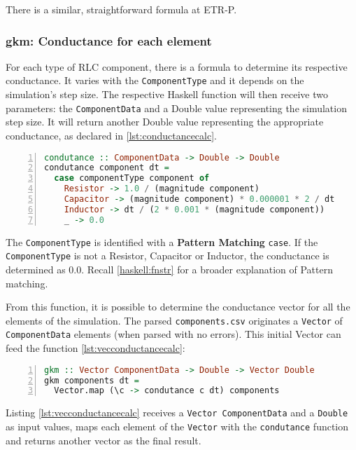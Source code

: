 There is a similar, straightforward formula at ETR-P.

\subsubsection {gkm: Conductance for each element}

For each type of RLC component, there is a formula to determine its respective conductance. It varies with the \lstinline!ComponentType! and it depends on the simulation's step size. The respective Haskell function will then receive two parameters: the \lstinline!ComponentData! and a Double value representing the simulation step size. It will return another Double value representing the appropriate conductance, as declared in \cref{lst:conductancecalc}.


\begin{lstlisting}[language=Haskell, numbers=left, caption={Determining the conductance for each element gkm}, captionpos=b, label={lst:conductancecalc}]
condutance :: ComponentData -> Double -> Double
condutance component dt =
  case componentType component of
    Resistor -> 1.0 / (magnitude component)
    Capacitor -> (magnitude component) * 0.000001 * 2 / dt
    Inductor -> dt / (2 * 0.001 * (magnitude component))
    _ -> 0.0
\end{lstlisting}

The \lstinline!ComponentType! is identified with a \textbf{Pattern Matching} \lstinline!case!. If the \lstinline!ComponentType! is not a Resistor, Capacitor or Inductor, the conductance is determined as $ 0.0 $. Recall \cref{haskell:fnstr} for a broader explanation of Pattern matching.

From this function, it is possible to determine the conductance vector for all the elements of the simulation. The parsed \lstinline!components.csv! originates a \lstinline!Vector! of \lstinline!ComponentData! elements (when parsed with no errors). This initial Vector can feed the function \cref{lst:vecconductancecalc}:

\begin{lstlisting}[language=Haskell, numbers=left, caption={Determining the conductance vector gkm}, captionpos=b, label={lst:vecconductancecalc}]
gkm :: Vector ComponentData -> Double -> Vector Double
gkm components dt =
  Vector.map (\c -> condutance c dt) components
\end{lstlisting}

Listing \ref{lst:vecconductancecalc} receives a \lstinline!Vector ComponentData! and a \lstinline!Double! as input values, maps each element of the \lstinline!Vector! with the \lstinline!condutance! function and returns another vector as the final result.

